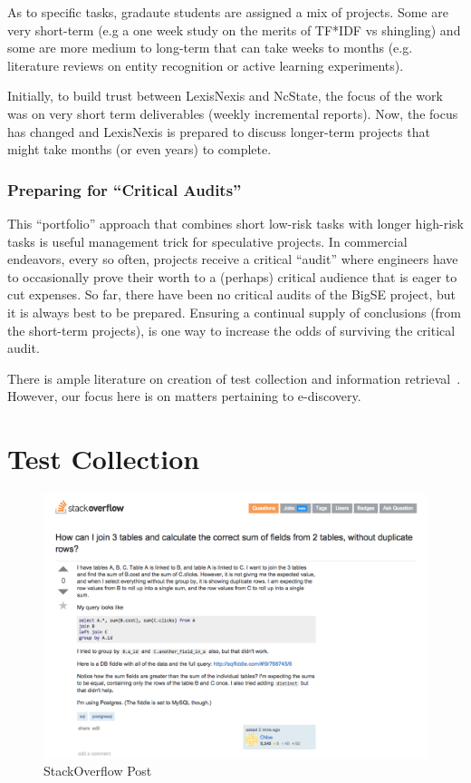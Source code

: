 \documentclass{sig-alternate-05-2015}
\begin{document}
As to specific tasks, gradaute students are assigned a mix of projects. Some are very short-term (e.g a one week
study on the merits of TF*IDF vs shingling) and some are more medium to long-term
that can take weeks to months (e.g. literature reviews on entity recognition or
active learning experiments). 

Initially, to build trust between LexisNexis and NcState, the focus of the work was on very
short term deliverables (weekly incremental reports). Now, the focus has changed and
LexisNexis is prepared to discuss longer-term projects that might take months (or even
years) to complete. 

\subsubsection{Preparing for  ``Critical Audits''}
This ``portfolio'' approach  that combines short low-risk tasks with longer high-risk tasks is useful management trick for speculative projects.
In commercial endeavors, every so often, projects receive a critical  ``audit''  where engineers have to
occasionally prove their worth to a (perhaps) critical audience that is eager  to cut
expenses.  So far,
there have been no critical audits of the BigSE project, but it is always
best to be prepared. Ensuring a continual supply of conclusions (from the short-term projects),
is one way to increase the odds of surviving the critical audit.
 
 
  
  
There is ample literature on creation of test collection and information retrieval~\cite{sanderson2010test}. However, our focus here is on matters pertaining to e-discovery. 
 


\section{Test Collection}

\begin{figure}[t]
  \includegraphics[width=\linewidth]{./fig/example.png}
  \caption{StackOverflow Post}
  \label{fig:example}
\end{figure}
\end{document}
